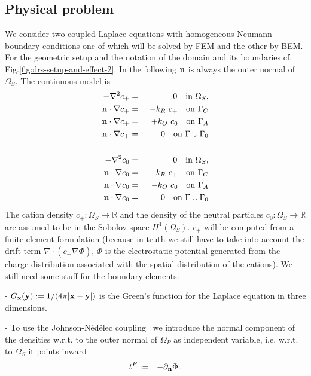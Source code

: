 \documentclass[runningheads]{lncse}
\begin{document}
\subsection{Physical problem}

We consider two coupled Laplace equations with homogeneous Neumann boundary conditions one of which will be solved by FEM and the other by BEM.
% 
For the geometric setup and the notation of the domain and its  boundaries cf. Fig.\ref{fig:drs-setup-and-effect-2}.
%
In the following ${\bf n}$ is always the outer normal of $\Omega_S$.
%
The continuous model is
%
\begin{eqnarray}
\label{eq:cats}
- \nabla^2 c_+ & = & 0 \quad \textrm{in} ~ \Omega_S, \\
%
{\bf n} \cdot \nabla c_+ & = & ~ - k_R~c_+  \quad \textrm{on} ~   \Gamma_C   \\
%
{\bf n} \cdot \nabla c_+ & = & ~ + k_O~c_0  \quad \textrm{on} ~   \Gamma_A   \\
%
{\bf n} \cdot \nabla c_+ & = & 0  \quad \textrm{on} ~   \Gamma \cup \Gamma_0 \\
\nonumber \\
- \nabla^2 c_0 & = & 0 \quad \textrm{in} ~ \Omega_S, \\
%
{\bf n} \cdot \nabla c_0 & = & ~ + k_R~c_+  \quad \textrm{on} ~   \Gamma_C   \\
%
{\bf n} \cdot \nabla c_0 & = & ~ - k_O~c_0  \quad \textrm{on} ~   \Gamma_A   \\
%
{\bf n} \cdot \nabla c_0 & = & 0  \quad \textrm{on} ~   \Gamma \cup \Gamma_0 
\end{eqnarray}
%
The cation density $c_+:\Omega_S \to \mathbb{R}$ and the density of the neutral particles $c_0:\Omega_S \to \mathbb{R}$ are assumed to be in the Sobolov space $H^1(\Omega_S)$.
%
$c_+$ will be computed from a finite element formulation (because in truth we still have to take into account the drift term $\nabla \cdot (c_+\nabla \Phi)$, $\Phi$ is the electrostatic potential generated from the charge distribution associated with the spatial distribution of the cations).
%
We still need some stuff for the boundary elements:

- $G_{\bf x}({\bf y}) := 1 / (4 \pi |  {\bf x} - {\bf y} | )  $
%
is the Green's function for the Laplace equation in three dimensions.
%

- To use the Johnson-N\'ed\'elec coupling~\cite{johnson1980coupling} we introduce the normal component of the densities w.r.t. to the outer normal of $\Omega_P$ as independent variable, i.e. w.r.t. to $\Omega_S$ it points inward
%
\begin{eqnarray}
t^P  & := & -\partial_{{\bf n}}\Phi \,.
\end{eqnarray}
\end{document}
